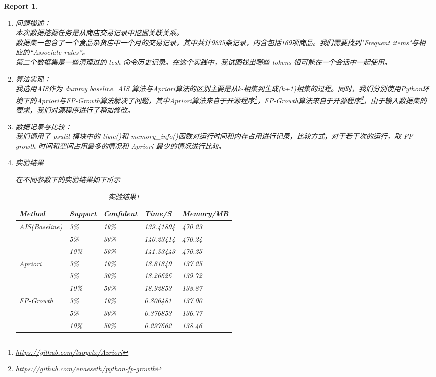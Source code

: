 \documentclass[a4paper,UTF8]{article}
\numberwithin{equation}{section}
\newtheorem*{mySol}{Report}
\begin{document}
\begin{mySol}
~\\
\begin{enumerate}
\item 问题描述：
~\\
本次数据挖掘任务是从商店交易记录中挖掘关联关系。\\
数据集一包含了一个食品杂货店中一个月的交易记录，其中共计9835条记录，内含包括169项商品。我们需要找到"Frequent items"与相应的“Associate rules”。\\
第二个数据集是一些清理过的 tcsh 命令历史记录。在这个实践中，我试图找出哪些 tokens 很可能在一个会话中一起使用。
\newpage
\item  算法实现：
~\\ 
我选用AIS作为 dummy baseline. AIS 算法与Apriori算法的区别主要是从k-相集到生成(k+1)相集的过程。同时，我们分别使用Python环境下的Apriori与FP-Growth算法解决了问题，其中Apriori算法来自于开源程序\footnote{\url{https://github.com/luoyetx/Apriori}}，FP-Growth算法来自于开源程序\footnote{\url{https://github.com/enaeseth/python-fp-growth}}，由于输入数据集的要求，我们对源程序进行了稍加修改。

\item 数据记录与比较：
~\\
我们调用了 psutil 模块中的 time()和 memory\_info()函数对运行时间和内存占用进行记录，比较方式，对于若干次的运行，取 FP-growth 时间和空间占用最多的情况和 Apriori 最少的情况进行比较。
\item 实验结果
\par 在不同参数下的实验结果如下所示


\begin{table}[H]
\centering
\caption{实验结果1}
\label{my-label}
\begin{tabular}{|l|l|l|l|l|}
\hline
Method                         & Support & Confident & Time/S   & Memory/MB \\ \hline
\multirow{3}{*}{AIS(Baseline)} & 3\%  & 10\%    & 139.41894 & 470.23    \\ \cline{2-5} 
                               & 5\%   & 30\%     & 140.23414 & 470.24    \\ \cline{2-5} 
                               & 10\%     & 50\%       & 141.33443 & 470.25    \\ \hline
\multirow{3}{*}{Apriori}       & 3\%  & 10\%    & 18.81849 & 137.25    \\ \cline{2-5} 
                               & 5\%   & 30\%     & 18.26626 & 139.72    \\ \cline{2-5} 
                               & 10\%     & 50\%       & 18.92853 & 138.87    \\ \hline
\multirow{3}{*}{FP-Growth}     & 3\%  & 10\%    & 0.806481 & 137.00    \\ \cline{2-5} 
                               & 5\%  & 30\%    & 0.376853 & 136.77    \\ \cline{2-5} 
                               & 10\%     & 50\%       & 0.297662 & 138.46    \\ \hline
\end{tabular}
\end{table}


\end{enumerate}
\end{mySol}
\end{document}
